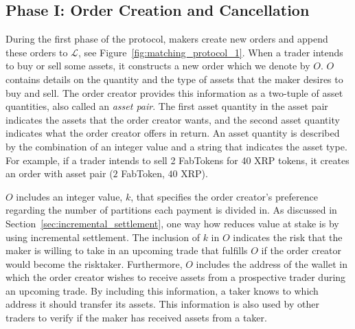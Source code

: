 \subsection*{Phase I: Order Creation and Cancellation}
\label{sec:phase_matching}

During the first phase of the \ModelName{} protocol, makers create new orders and append these orders to $ \mathcal{L} $, see Figure~\ref{fig:matching_protocol_1}.
When a trader intends to buy or sell some assets, it constructs a new order which we denote by $ O $.
$ O $ contains details on the quantity and the type of assets that the maker desires to buy and sell.
The order creator provides this information as a two-tuple of asset quantities, also called an \emph{asset pair}.
The first asset quantity in the asset pair indicates the assets that the order creator wants, and the second asset quantity indicates what the order creator offers in return.
An asset quantity is described by the combination of an integer value and a string that indicates the asset type.
For example, if a trader intends to sell 2 FabTokens for 40 XRP tokens, it creates an order with asset pair ($ 2 $ FabToken, $ 40 $ XRP).

$ O $ includes an integer value, $ k $, that specifies the order creator's preference regarding the number of partitions each payment is divided in.
As discussed in Section~\ref{sec:incremental_settlement}, one way how \ModelName{} reduces value at stake is by using incremental settlement.
The inclusion of $ k $ in $ O $ indicates the risk that the maker is willing to take in an upcoming trade that fulfills $ O $ if the order creator would become the risktaker.
Furthermore, $ O $ includes the address of the wallet in which the order creator wishes to receive assets from a prospective trader during an upcoming trade.
By including this information, a taker knows to which address it should transfer its assets.
This information is also used by other traders to verify if the maker has received assets from a taker.


